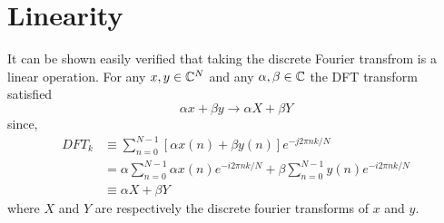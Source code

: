 \section{Linearity} It can be shown easily verified that taking the discrete
Fourier transfrom is a linear operation. For any $x,y \in \mathbb{C}^{N}$ and
any $\alpha,\beta \in \mathbb{C}$ the DFT transform satisfied
$$
\alpha x + \beta y \to \alpha X + \beta Y
$$
since,
\begin{align*} DFT_k &\equiv \sum_{n=0}^{N-1} \left[ \alpha x(n) + \beta y(n)
\right] e^{-j 2 \pi n k / N} \\ &= \alpha \sum_{n=0}^{N-1} \alpha x(n) e ^ {-i 2
\pi n k /N} + \beta \sum_{n=0}^{N-1} y(n) e^{-i 2 \pi n k / N} \\ &\equiv \alpha
X + \beta Y
\end{align*} where $X$ and $Y$ are respectively the discrete fourier transforms
of $x$ and $y$.

